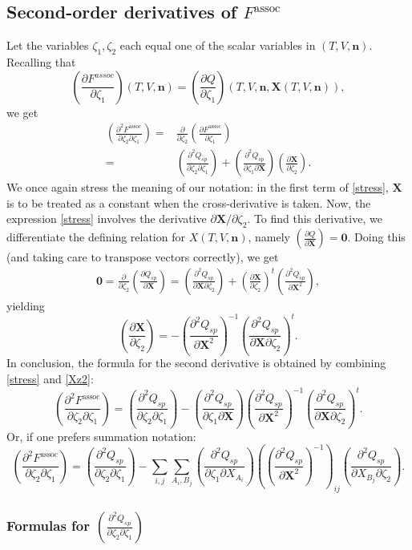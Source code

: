 \documentclass[internal,english]{sintefmemo2012}
\newcommand{\mbf}[0]{\mathbf}
\newcommand*{\pder}[2]{\left(\frac{\partial #1}{\partial #2}\right)}
\newcommand*{\pdder}[2]{\left(\frac{\partial^2 #1}{\partial #2^2}\right)}
\newcommand*{\pdcross}[3]{\left(\frac{\partial^2 #1}{\partial #2 \partial #3}\right)}
\newcommand{\z}{\zeta}
\newcommand{\lp}{\left(}
\newcommand{\rp}{\right)}
\begin{document}
\subsection{Second-order derivatives of $F^{\text{assoc}}$}
Let the variables $\z_1,\z_2$ each equal one of the scalar variables in $(T,V,\mbf n)$. Recalling that 
$$
\pder{F^{assoc}}{\z_1}(T,V,\mbf n) = \pder{Q}{\z_1}(T,V,\mbf n,\mbf X(T,V,\mbf n)),
$$
we get
\begin{align}
  \pdcross{F^{\text{assoc}}}{\z_2}{\z_1} =& \frac{\partial}{\partial \z_2} \pder{F^{\text{assoc}}}{\z_1} \\
  =& \pdcross{Q_{sp}}{\z_2}{\z_1} + \pdcross{Q_{sp}}{\z_1}{\mbf X} \pder{\mbf X}{\z_2}. \label{stress}
\end{align}
We once again stress the meaning of our notation: in the first term of
\eqref{stress}, $\mbf X$ is to be treated as a constant when the
cross-derivative is taken. Now, the expression \eqref{stress} involves the
derivative $\partial \mbf X/\partial \z_2$. To find this derivative, we
differentiate the defining relation for $X(T,V,\mbf n)$, namely
$\pder{Q}{\mbf X} = \mbf 0$. Doing this (and taking care to transpose vectors
correctly), we get
\begin{align}
 \mbf 0 = \frac{\partial}{\partial \z_2} \pder{Q_{sp}}{\mbf X} = \pdcross{Q_{sp}}{\mbf X}{\z_2} + \pder{\mbf X}{\z_2}^t \pdder{Q_{sp}}{\mbf X},
\end{align}
yielding
\begin{equation}
  \label{Xz2}
  \pder{\mbf X}{\z_2} = - \pdder{Q_{sp}}{\mbf X}^{-1} \pdcross{Q_{sp}}{\mbf X}{\z_2}^t.
\end{equation}
In conclusion, the formula for the second derivative is obtained by combining
\eqref{stress} and \eqref{Xz2}:
\begin{equation}
  \pdcross{F^{\text{assoc}}}{\z_2}{\z_1} = \pdcross{Q_{sp}}{\z_2}{\z_1} -  \pdcross{Q_{sp}}{\z_1}{\mbf X} \pdder{Q_{sp}}{\mbf X}^{-1} \pdcross{Q_{sp}}{\mbf X}{\z_2}^t.
\end{equation}
Or, if one prefers summation notation:
\begin{equation}
  \pdcross{F^{\text{assoc}}}{\z_2}{\z_1} = \pdcross{Q_{sp}}{\z_2}{\z_1} -  \sum_{i,j} \sum_{A_i,B_j} \pdcross{Q_{sp}}{\z_1}{X_{A_i}} \lp \pdder{Q_{sp}}{\mbf X}^{-1} \rp_{ij} \pdcross{Q_{sp}}{X_{B_j}}{\z_2}.
\end{equation}

\subsubsection{Formulas for $\pdcross{Q_{sp}}{\z_2}{\z_1}$}
\end{document}
